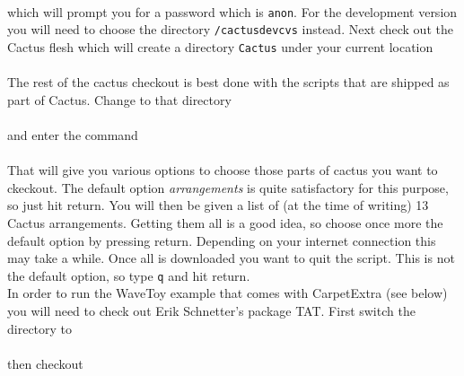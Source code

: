 \documentclass[11pt]{article}
\numberwithin{equation}{section}
\begin{document}
\hspace{1cm}{\tt cvs -d :pserver:cvs\_anon@cvs.cactuscode.org:/cactus login} \\

which will prompt you for a password which is {\tt anon}.
For the development version you will need to choose
the directory {\tt /cactusdevcvs} instead.
Next check out the Cactus
flesh which will create a directory {\tt Cactus} under your current location\\

\hspace{1cm}{\tt cvs -d :pserver:cvs\_anon@cvs.cactuscode.org:/cactus checkout Cactus} \\

The rest of the cactus checkout is best done with the scripts that are shipped
as part of Cactus. Change to that directory\\

\hspace{1cm}{\tt cd Cactus} \\

and enter the command\\

\hspace{1cm}{\tt make checkout} \\

That will give you various options to choose those parts of cactus you
want to ckeckout. The default option {\em arrangements} is quite
satisfactory for this purpose, so just hit return. You will then be
given a list of (at the time of writing) 13 Cactus arrangements. Getting
them all is a good idea, so choose once more the default option by pressing
return. Depending on your internet connection this may take a while.
Once all is downloaded you want to quit the script. This is not the
default option, so type {\tt q} and hit return. \\

In order to run the WaveToy example that comes with CarpetExtra
(see below) you will need to check out
Erik Schnetter's package TAT. First switch the directory to\\

\hspace{1cm}{\tt cd arrangements} \\

then checkout\\

\hspace{1cm}{\tt cvs -d :pserver:cvs\_anon@cvs.cactuscode.org:/arrangements checkout TAT} \\
\end{document}
